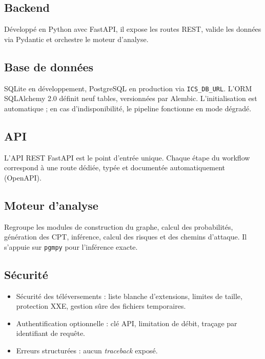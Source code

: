 \documentclass[12pt,a4paper]{article}
\newcommand{\forcereset}[1]{}
\begin{document}
\subsection{Backend}
\forcereset{4}

Développé en Python avec FastAPI, il expose les routes REST, valide les données via Pydantic et orchestre le moteur d'analyse.

\subsection{Base de données}
\forcereset{5}

SQLite en développement, PostgreSQL en production via \texttt{ICS\_DB\_URL}. L'ORM SQLAlchemy 2.0 définit neuf tables, versionnées par Alembic. L'initialisation est automatique ; en cas d'indisponibilité, le pipeline fonctionne en mode dégradé.

\subsection{API}
\forcereset{4}

L'API REST FastAPI est le point d'entrée unique. Chaque étape du workflow correspond à une route dédiée, typée et documentée automatiquement (OpenAPI).

\subsection{Moteur d'analyse}
\forcereset{4}

Regroupe les modules de construction du graphe, calcul des probabilités, génération des CPT, inférence, calcul des risques et des chemins d'attaque. Il s'appuie sur \texttt{pgmpy} pour l'inférence exacte.

\subsection{Sécurité}
\forcereset{5}

\begin{itemize}[leftmargin=1.2cm, itemsep=0.2\baselineskip]
    \item Sécurité des téléversements : liste blanche d'extensions, limites de taille, protection XXE, gestion sûre des fichiers temporaires.
    \item Authentification optionnelle : clé API, limitation de débit, traçage par identifiant de requête.
    \item Erreurs structurées : aucun \emph{traceback} exposé.
\end{itemize}
\end{document}
